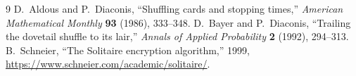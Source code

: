 \documentclass[11pt]{article}
\begin{document}
\begin{thebibliography}{9}
 D.~Aldous and P.~Diaconis,
``Shuffling cards and stopping times,''
\emph{American Mathematical Monthly} \textbf{93} (1986), 333--348.
 D.~Bayer and P.~Diaconis,
``Trailing the dovetail shuffle to its lair,''
\emph{Annals of Applied Probability} \textbf{2} (1992), 294--313.
 B.~Schneier,
``The Solitaire encryption algorithm,'' 1999,
\url{https://www.schneier.com/academic/solitaire/}.
\end{thebibliography}
\end{document}
